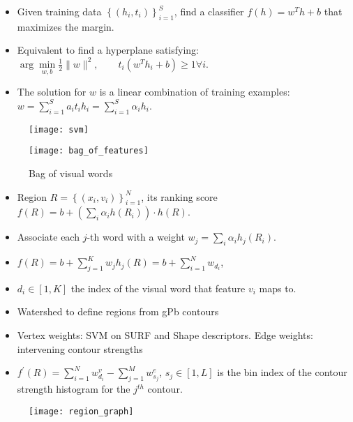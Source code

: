 \documentclass[11pt, a4paper, landscape]{article}
\begin{document}
\NewPage{}
\vfill
\begin{itemize}
\item Given training data $\left\lbrace (h_i, t_i) \right\rbrace _{i = 1} ^S$, find a classifier $f(h) = w^Th + b$ that maximizes the margin.
\item Equivalent to find a hyperplane satisfying: $\arg\min\limits_{w, b} \frac{1}{2} \|w\| ^2, \qquad t_i(w^Th_i + b) \geq 1 \forall i$.
\item The solution for $w$ is a linear combination of training examples: $w = \sum\limits_{i = 1}^{S} a_it_ih_i = \sum\limits_{i = 1}^{S} \alpha_ih_i$.
\end{itemize}
\begin{figure}
	\centering
	\texttt{[image: svm]}
\end{figure}
\vfill


\NewPage{}
\vfill
\begin{figure}
	\centering
	\texttt{[image: bag\_of\_features]}
	\caption{Bag of visual words}
\end{figure}
\begin{itemize}
\item Region $R = \left\lbrace (x_i, v_i) \right\rbrace _{i = 1} ^N$, its ranking score $f(R) = b + (\sum_i\alpha_ih(R_i)) \cdot h(R)$.
\item Associate each $j$-th word with a weight $w_j = \sum_i\alpha_ih_j(R_i)$.
\item $f(R) = b + \sum\limits_{j = 1}^{K} w_jh_j(R) = b + \sum\limits_{i = 1}^{N} w_{d_i}$, 
\item $d_i \in \left[ 1, K \right] $ the index of the visual word that feature $v_i$ maps to.
\end{itemize}
\vfill



\NewPage{}
\vfill
\begin{itemize}
\item Watershed to define regions from gPb contours
\item Vertex weights: SVM on SURF and Shape descriptors. Edge weights: intervening contour strengths
\item $f^{\prime}(R) = \sum\limits_{i = 1}^{N}w^v_{d_i} - \sum\limits_{j = 1}^{M} w^e_{s_j}$, $s_j \in \left[ 1, L \right] $ is the bin index of the contour strength histogram for the $j^{th}$ contour.
\end{itemize}
\begin{figure}
	\centering
	\texttt{[image: region\_graph]}
\end{figure}
\vfill
\end{document}
